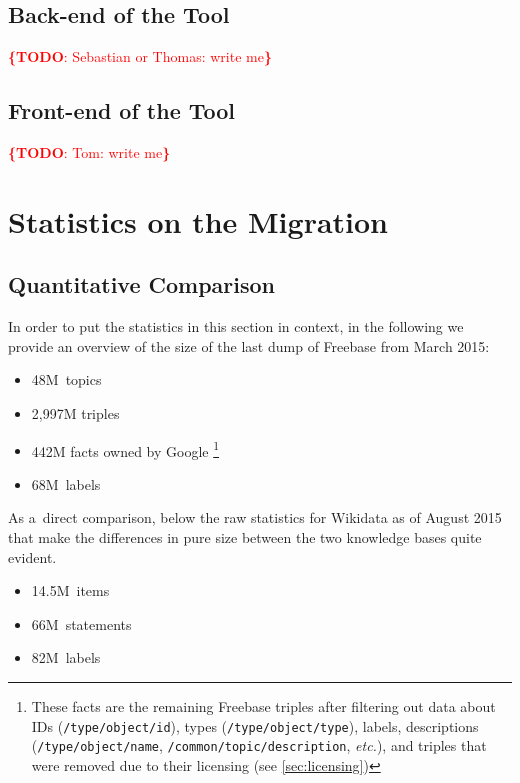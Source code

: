 \documentclass{sig-alternate}
\newcommand{\todo}[1]{\noindent\textcolor{red}{{\bf \{TODO}: #1{\bf \}}}}
\begin{document}
\subsection{Back-end of the Tool}

\todo{Sebastian or Thomas: write me}

\subsection{Front-end of the Tool}

\todo{Tom: write me}

\section{Statistics on the Migration}\label{sec:statistics-of-the-migration}

\subsection{Quantitative Comparison}

In order to put the statistics in this section in context,
in the following we provide an overview of the size of the last dump of Freebase
from March 2015:

\begin{itemize}
  \setlength\itemsep{0em}
  \item 48M~topics
  \item 2,997M triples
  \item 442M facts owned by Google%
    \footnote{These facts are the remaining Freebase triples
      after filtering out data about IDs (\texttt{/type/object/id}),
      types (\texttt{/type/object/type}), labels, descriptions (\texttt{/type/object/name},
      \texttt{/common/topic/description}, \emph{etc.}), and triples that were removed
      due to their licensing (see \autoref{sec:licensing})}
  \item 68M~labels
\end{itemize}

As a~direct comparison, below the raw statistics for Wikidata as of August 2015
that make the differences in pure size between the two knowledge bases quite evident.

\begin{itemize}
    \setlength\itemsep{0em}
    \item 14.5M~items
    \item 66M~statements
    \item 82M~labels
\end{itemize}
\end{document}
